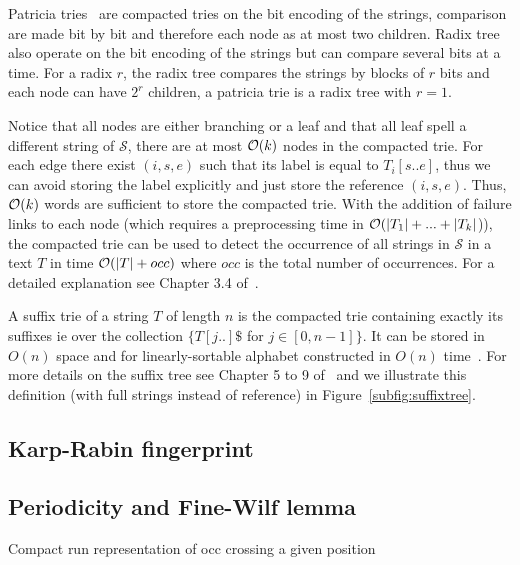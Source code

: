 Patricia tries~\cite{morrison1968patricia} are compacted tries on the bit encoding of the strings, comparison are made bit by bit and therefore each node as at most two children. Radix tree also operate on the bit encoding of the strings but can compare several bits at a time. For a radix $r$, the radix tree compares the strings by blocks of $r$ bits and each node can have $2^r$ children, a patricia trie is a radix tree with $r=1$.

Notice that all nodes are either branching or a leaf and that all leaf spell a different string of $\mathcal{S}$, there are at most $\mathcal{O}(k)$ nodes in the compacted trie.
For each edge there exist $(i,s,e)$ such that its label is equal to $T_i[s .. e]$, thus we can avoid storing the label explicitly and just store the reference $(i,s,e)$.
Thus, $\mathcal{O}(k)$ words are sufficient to store the compacted trie.
%
With the addition of failure links to each node (which requires a preprocessing time in $\mathcal{O}(|T_1| + ... +|T_k|$)), the compacted trie can be used to detect the occurrence of all strings in $\mathcal{S}$ in a text $T$ in time $\mathcal{O}(|T|+occ)$ where $occ$ is the total number of occurrences. For a detailed explanation see Chapter 3.4 of~\cite{Gusfield1997}. 


A suffix trie of a string $T$ of length $n$ is the compacted trie containing exactly its suffixes ie over the collection $\{T[j..]\$$ for $ j \in [0,n-1] \}$. It can be stored in $O(n)$ space and for linearly-sortable alphabet constructed in $O(n)$ time~\cite{Farach1997}. For more details on the suffix tree see Chapter 5 to 9 of~\cite{Gusfield1997} and we illustrate this definition (with full strings instead of reference) in Figure~\ref{subfig:suffixtree}.




\subsection{Karp-Rabin fingerprint}

\subsection{Periodicity and Fine-Wilf lemma}
Compact run representation of occ crossing a given position

